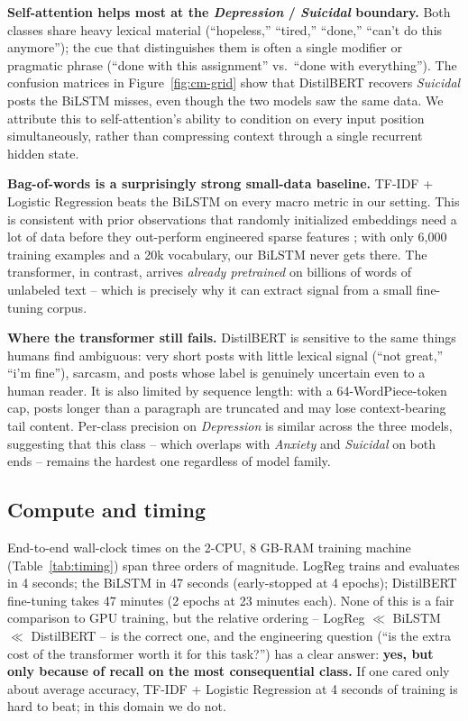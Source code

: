 \documentclass[12pt]{article}
\begin{document}
\textbf{Self-attention helps most at the \textit{Depression} /
\textit{Suicidal} boundary.} Both classes share heavy lexical
material (``hopeless,'' ``tired,'' ``done,'' ``can't do this
anymore''); the cue that distinguishes them is often a single
modifier or pragmatic phrase (``done with this assignment'' vs.\
``done with everything''). The confusion matrices in
Figure~\ref{fig:cm-grid} show that DistilBERT recovers
\textit{Suicidal} posts the BiLSTM misses, even though the two models
saw the same data. We attribute this to self-attention's ability to
condition on every input position simultaneously, rather than
compressing context through a single recurrent hidden state.

\textbf{Bag-of-words is a surprisingly strong small-data baseline.}
TF-IDF + Logistic Regression beats the BiLSTM on every macro metric
in our setting. This is consistent with prior observations that
randomly initialized embeddings need a lot of data before they
out-perform engineered sparse features
\cite{Wang2018GLUE}; with only 6{,}000 training examples and a 20k
vocabulary, our BiLSTM never gets there. The transformer, in contrast,
arrives \emph{already pretrained} on billions of words of unlabeled
text -- which is precisely why it can extract signal from a small
fine-tuning corpus.

\textbf{Where the transformer still fails.} DistilBERT is sensitive
to the same things humans find ambiguous: very short posts with
little lexical signal (``not great,'' ``i'm fine''), sarcasm, and
posts whose label is genuinely uncertain even to a human reader.
It is also limited by sequence length: with a 64-WordPiece-token cap,
posts longer than a paragraph are truncated and may lose
context-bearing tail content. Per-class precision on
\textit{Depression} is similar across the three models, suggesting
that this class -- which overlaps with \textit{Anxiety} and
\textit{Suicidal} on both ends -- remains the hardest one regardless
of model family.

\subsection{Compute and timing}

End-to-end wall-clock times on the 2-CPU, 8 GB-RAM training machine
(Table~\ref{tab:timing}) span three orders of magnitude.
LogReg trains and evaluates in 4 seconds; the BiLSTM in 47 seconds
(early-stopped at 4 epochs); DistilBERT fine-tuning takes 47 minutes
(2 epochs at 23 minutes each). None of this is a fair comparison to
GPU training, but the relative ordering -- LogReg $\ll$ BiLSTM $\ll$
DistilBERT -- is the correct one, and the engineering question
(``is the extra cost of the transformer worth it for this task?'')
has a clear answer: \textbf{yes, but only because of recall on the
most consequential class.} If one cared only about average accuracy,
TF-IDF + Logistic Regression at 4 seconds of training is hard to
beat; in this domain we do not.
\end{document}

